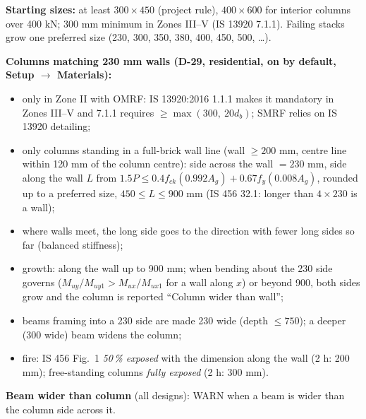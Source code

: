 \documentclass[10pt,a4paper]{article}
\newcommand{\fck}{f_{ck}}
\newcommand{\fy}{f_{y}}
\begin{document}
\textbf{Starting sizes:} at least $300\times450$ (project rule), $400\times600$ for interior columns over 400 kN;
300 mm minimum in Zones III--V (IS 13920 7.1.1). Failing stacks grow one preferred size
(230, 300, 350, 380, 400, 450, 500, \dots).

\textbf{Columns matching 230 mm walls (D-29, residential, on by default, Setup $\rightarrow$ Materials):}
\begin{itemize}
\item only in Zone II with OMRF: IS 13920:2016 1.1.1 makes it mandatory in Zones III--V and 7.1.1 requires
$\ge\max(300,\ 20d_b)$; SMRF relies on IS 13920 detailing;
\item only columns standing in a full-brick wall line (wall $\ge200$ mm, centre line within 120 mm of the column centre):
side across the wall $=230$ mm, side along the wall $L$ from $1.5P\le0.4\fck(0.992A_g)+0.67\fy(0.008A_g)$, rounded up
to a preferred size, $450\le L\le900$ mm (IS 456 32.1: longer than $4\times230$ is a wall);
\item where walls meet, the long side goes to the direction with fewer long sides so far (balanced stiffness);
\item growth: along the wall up to 900 mm; when bending about the 230 side governs
($M_{uy}/M_{uy1}>M_{ux}/M_{ux1}$ for a wall along $x$) or beyond 900, both sides grow and the column is reported
``Column wider than wall'';
\item beams framing into a 230 side are made 230 wide (depth $\le750$); a deeper (300 wide) beam widens the column;
\item fire: IS 456 Fig.~1 \emph{50\,\% exposed} with the dimension along the wall (2 h: 200 mm); free-standing columns
\emph{fully exposed} (2 h: 300 mm).
\end{itemize}
\textbf{Beam wider than column} (all designs): WARN when a beam is wider than the column side across it.

\end{document}
